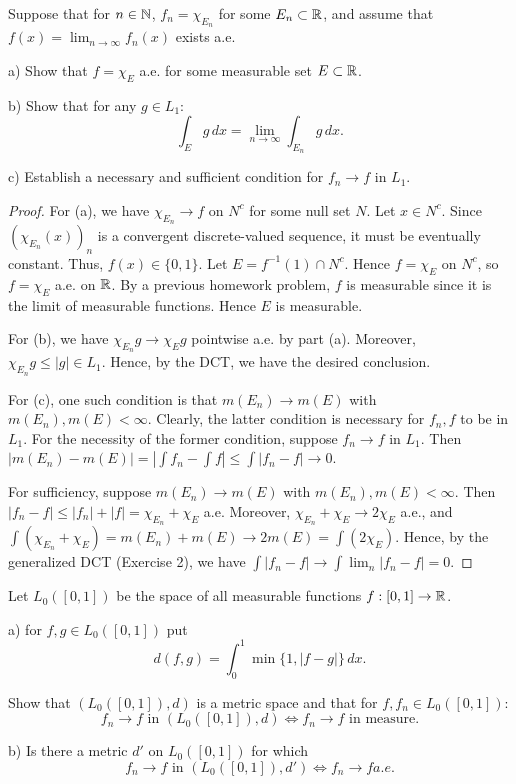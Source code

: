 \documentclass{article}
\begin{document}
 Suppose that for $n \in \mathbb{N}$, $f_n = \chi_{E_n}$ for some $E_n \subset \mathbb{R}$, and assume that $f(x) = \lim_{n \to \infty} f_n(x)$ exists a.e.

a) Show that $f = \chi_E$ a.e. for some measurable set $E \subset \mathbb{R}$.

b) Show that for any $g \in L_1$:
$$ \int_E g \, dx = \lim_{n \to \infty} \int_{E_n} g \, dx.$$

c) Establish a necessary and sufficient condition for $f_n \to f$ in $L_1$.

\begin{proof}
For (a), we have $\chi_{E_n} \to f$ on $N^c$ for some null set $N$.  Let $x \in N^c$. Since $(\chi_{E_n}(x))_n$ is a convergent discrete-valued sequence, it must be eventually constant.  Thus, $f(x) \in \{0,1\}$.  Let $E = f^{-1}(1) \cap N^c$.  Hence $f = \chi_E$ on $N^c$, so $f = \chi_E$ a.e. on $\mathbb{R}$. By a previous homework problem, $f$ is measurable since it is the limit of measurable functions.  Hence $E$ is measurable.  

For (b), we have $\chi_{E_n} g \to \chi_E g$ pointwise a.e. by part (a).  Moreover, $\chi_{E_n} g \le |g| \in L_1$. Hence, by the DCT, we have the desired conclusion.

For (c), one such condition is that $m(E_n) \to m(E)$ with $m(E_n), m(E) < \infty$.  Clearly, the latter condition is necessary for $f_n, f$ to be in $L_1$.  For the necessity of the former condition, suppose $f_n \to f$ in $L_1$.  Then $|m(E_n) - m(E)| = |\int f_n - \int f | \le \int |f_n - f| \to 0$.

For sufficiency, suppose $m(E_n) \to m(E)$ with $m(E_n), m(E) < \infty$.    Then $|f_n - f| \le |f_n| + |f| = \chi_{E_n} + \chi_E$ a.e.  Moreover, $\chi_{E_n} + \chi_E \to 2 \chi_E$  a.e., and $\int (\chi_{E_n} + \chi_E) = m(E_n) + m(E) \to 2 m(E) = \int (2 \chi_E)$.  Hence, by the generalized DCT (Exercise 2), we have
$\int |f_n - f| \to \int \lim_n |f_n - f| = 0$.
\end{proof}

 Let $L_0([0,1])$ be the space of all measurable functions $f : [0,1] \to \mathbb{R}$.

a) for $f,g \in L_0([0,1])$ put
$$d(f, g) = \int_0^1 \min\{1, |f - g|\} \, dx.$$

Show that $(L_0([0,1]), d)$ is a metric space and that for $f, f_n \in L_0([0,1])$:
$$ f_n \to f \text{ in } (L_0([0,1]), d) \iff f_n \to f \text { in measure.}$$

b) Is there a metric $d'$ on $L_0([0,1])$ for which 
$$f_n \to f \text{ in } (L_0([0,1]), d') \iff f_n \to f a.e.  $$
\end{document}
